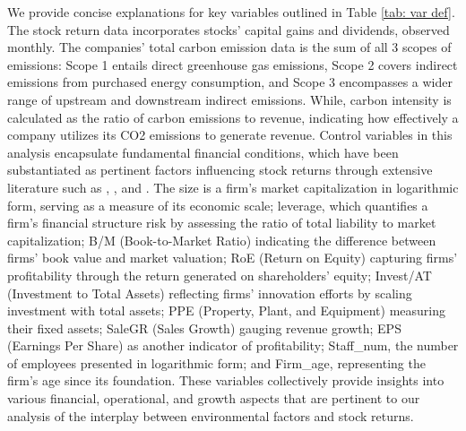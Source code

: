 \documentclass[12pt]{article}
\begin{document}
We provide concise explanations for key variables outlined in Table \ref{tab: var def}. The stock return data incorporates stocks' capital gains and dividends, observed monthly. The companies' total carbon emission data is the sum of all 3 scopes of emissions: Scope 1 entails direct greenhouse gas emissions, Scope 2 covers indirect emissions from purchased energy consumption, and Scope 3 encompasses a wider range of upstream and downstream indirect emissions. While, carbon intensity is calculated as the ratio of carbon emissions to revenue, indicating how effectively a company utilizes its CO2 emissions to generate revenue. Control variables in this analysis encapsulate fundamental financial conditions, which have been substantiated as pertinent factors influencing stock returns through extensive literature such as \cite{aswani2023carbon}, \cite{bolton2023carbon}, and \cite{oestreich2015carbon}. The size is a firm's market capitalization in logarithmic form, serving as a measure of its economic scale; leverage, which quantifies a firm's financial structure risk by assessing the ratio of total liability to market capitalization; B/M (Book-to-Market Ratio) indicating the difference between firms' book value and market valuation; RoE (Return on Equity) capturing firms' profitability through the return generated on shareholders' equity; Invest/AT (Investment to Total Assets) reflecting firms' innovation efforts by scaling investment with total assets; PPE (Property, Plant, and Equipment) measuring their fixed assets; SaleGR (Sales Growth) gauging revenue growth; EPS (Earnings Per Share) as another indicator of profitability; Staff\_num, the number of employees presented in logarithmic form; and Firm\_age, representing the firm's age since its foundation. These variables collectively provide insights into various financial, operational, and growth aspects that are pertinent to our analysis of the interplay between environmental factors and stock returns.
\end{document}
